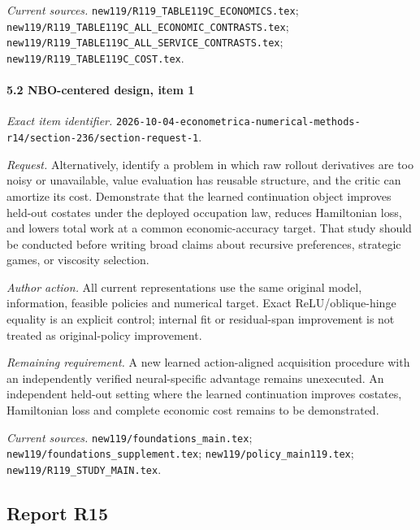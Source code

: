 \par\emph{Current sources.} \nolinkurl{new119/R119_TABLE119C_ECONOMICS.tex}; \nolinkurl{new119/R119_TABLE119C_ALL_ECONOMIC_CONTRASTS.tex}; \nolinkurl{new119/R119_TABLE119C_ALL_SERVICE_CONTRASTS.tex}; \nolinkurl{new119/R119_TABLE119C_COST.tex}.

\paragraph{5.2 NBO-centered design, item 1}

\emph{Exact item identifier.} \nolinkurl{2026-10-04-econometrica-numerical-methods-r14/section-236/section-request-1}.

\par\emph{Request.} Alternatively, identify a problem in which raw rollout derivatives are too noisy or unavailable, value evaluation has reusable structure, and the critic can amortize its cost. Demonstrate that the learned continuation object improves held-out costates under the deployed occupation law, reduces Hamiltonian loss, and lowers total work at a common economic-accuracy target. That study should be conducted before writing broad claims about recursive preferences, strategic games, or viscosity selection.

\par\emph{Author action.} All current representations use the same original model, information, feasible policies and numerical target. Exact ReLU/\allowbreak{}oblique-hinge equality is an explicit control; internal fit or residual-span improvement is not treated as original-policy improvement.

\par\emph{Remaining requirement.} A new learned action-aligned acquisition procedure with an independently verified neural-specific advantage remains unexecuted. An independent held-out setting where the learned continuation improves costates, Hamiltonian loss and complete economic cost remains to be demonstrated.

\par\emph{Current sources.} \nolinkurl{new119/foundations_main.tex}; \nolinkurl{new119/foundations_supplement.tex}; \nolinkurl{new119/policy_main119.tex}; \nolinkurl{new119/R119_STUDY_MAIN.tex}.

\subsection{Report R15}

